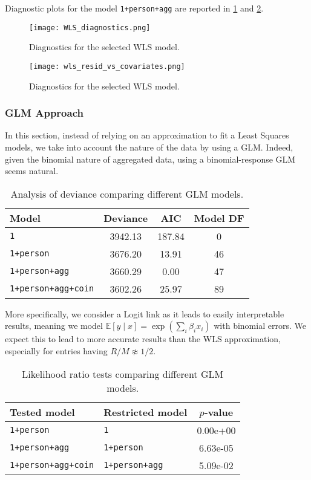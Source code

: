 \documentclass[a4paper, 12pt,oneside]{article}
\begin{document}
			Diagnostic plots for the model \texttt{1+person+agg} are reported in \ref{fig:wls-diagnostic} and \ref{fig:wls-diagnostic-time-coefs}. 

			\begin{figure}[htb]
				\centering
				\texttt{[image: WLS\_diagnostics.png]}
				\caption{Diagnostics for the selected WLS model.}
				\label{fig:wls-diagnostic}
			\end{figure}


			\begin{figure}[htb]
				\centering
				\texttt{[image: wls\_resid\_vs\_covariates.png]}
				\caption{Diagnostics for the selected WLS model.}
				\label{fig:wls-diagnostic-time-coefs}
			\end{figure}

			\subsubsection{GLM Approach}
			In this section, instead of relying on an approximation to fit a Least Squares models, we take into account the nature of the data by using a GLM. Indeed, given the binomial nature of aggregated data, using a binomial-response GLM seems natural. 
			\begin{table}[htb]
				\centering
				\caption{Analysis of deviance comparing different GLM models.}
				\label{tab:glm-model-comparison}
				\begin{tabular}{lccc}
				\toprule
				Model & Deviance & AIC & Model DF \\
				\midrule
				\texttt{1} & 3942.13 & 187.84 & 0 \\
				\texttt{1+person} & 3676.20 & 13.91 & 46 \\
				\texttt{1+person+agg} & 3660.29 & 0.00 & 47 \\
				\texttt{1+person+agg+coin} & 3602.26 & 25.97 & 89 \\
				\bottomrule
				\end{tabular}
			\end{table}
			More specifically, we consider a Logit link as it leads to easily interpretable results, meaning we model $\mathbb{E}[y\mid x]=\exp\left(\sum_i \beta_i x_i\right)$ with binomial errors. We expect this to lead to more accurate results than the WLS approximation, especially for entries having $R/M\not\approx 1/2$.
			\begin{table}[htb]
				\centering
				\caption{Likelihood ratio tests comparing different GLM models.}
				\label{tab:glm-lrt-comparison}
				\begin{tabular}{llc}
				\toprule
				Tested model & Restricted model & $p$-value \\
				\midrule
				\texttt{1+person} & \texttt{1} & 0.00e+00 \\
				\texttt{1+person+agg} & \texttt{1+person} & 6.63e-05 \\
				\texttt{1+person+agg+coin} & \texttt{1+person+agg} & 5.09e-02 \\
				\bottomrule
				\end{tabular}
			\end{table}
\end{document}
